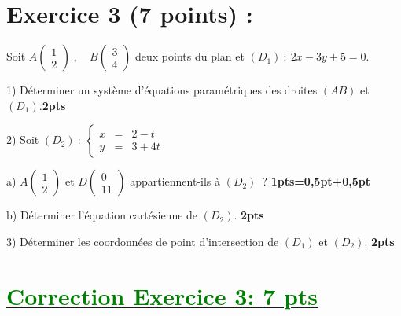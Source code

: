\documentclass[12pt]{article}
\begin{document}
\section*{Exercice 3 (7 points) :}
Soit $A\begin{pmatrix} 1 \\ 2\end{pmatrix}\;,\quad B\begin{pmatrix} 3 \\ 4\end{pmatrix}$ deux points du plan et $(D_{1})\ :\ 2x-3y+5=0.$

1) Déterminer un système d'équations paramétriques des droites $(AB)$ et $(D_{1}).$\textbf{2pts}

2) Soit $(D_{2})\ :\ \left\lbrace\begin{array}{rcl} x&=&2-t \\ y&=&3+4t\end{array}\right.$

a) $A\begin{pmatrix} 1 \\ 2\end{pmatrix}$ et $D\begin{pmatrix} 0 \\ 11\end{pmatrix}$ appartiennent-ils à $(D_{2})\;\ ?$ \textbf{1pts=0,5pt+0,5pt}

b) Déterminer l'équation cartésienne de $(D_{2})$. \textbf{2pts}

3) Déterminer les coordonnées de point d'intersection de $(D_{1})$ et $(D_{2})$. \textbf{2pts}
\section*{\underline{\textcolor{green}{Correction Exercice 3: \textbf{7 pts}}}}
\end{document}
